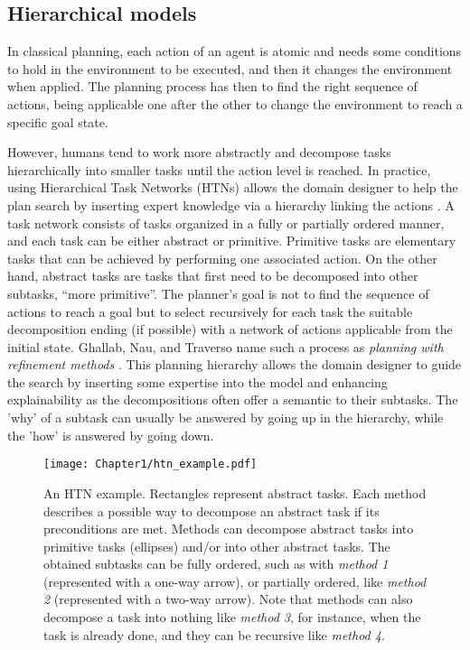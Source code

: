 \subsection{Hierarchical models}

In classical planning, each action of an agent is atomic and needs some conditions to hold in the environment to be executed, and then it changes the environment when applied. The planning process has then to find the right sequence of actions, being applicable one after the other to change the environment to reach a specific goal state. 

However, humans tend to work more abstractly and decompose tasks hierarchically into smaller tasks until the action level is reached. In practice, using Hierarchical Task Networks (HTNs) allows the domain designer to help the plan search by inserting expert knowledge via a hierarchy linking the actions \cite{erol_complexity_1996}. A task network consists of tasks organized in a fully or partially ordered manner, and each task can be either abstract or primitive. Primitive tasks are elementary tasks that can be achieved by performing one associated action.
On the other hand, abstract tasks are tasks that first need to be decomposed into other subtasks, ``more primitive''. The planner's goal is not to find the sequence of actions to reach a goal but to select recursively for each task the suitable decomposition ending (if possible) with a network of actions applicable from the initial state. Ghallab, Nau, and Traverso name such a process as \textit{planning with refinement methods} \cite{ghallab2016automated}. This planning hierarchy allows the domain designer to guide the search by inserting some expertise into the model and enhancing explainability as the decompositions often offer a semantic to their subtasks. The 'why' of a subtask can usually be answered by going up in the hierarchy, while the 'how' is answered by going down. 

\begin{figure}
    \center
    \texttt{[image: Chapter1/htn\_example.pdf]}
    \caption{An HTN example. Rectangles represent abstract tasks. Each method describes a possible way to decompose an abstract task if its preconditions are met. Methods can decompose abstract tasks into primitive tasks (ellipses) and/or into other abstract tasks. The obtained subtasks can be fully ordered, such as with \emph{method 1} (represented with a one-way arrow), or partially ordered, like \emph{method 2} (represented with a two-way arrow). Note that methods can also decompose a task into nothing like \emph{method 3}, for instance, when the task is already done, and they can be recursive like \emph{method 4}.
    }
    \label{fig:htn_example}
\end{figure}

